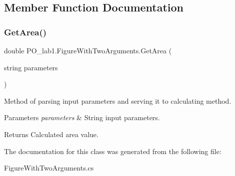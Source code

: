 \subsection{Member Function Documentation}
\mbox{\label{class_p_o__lab1_1_1_figure_with_two_arguments_a443df5d9e9eb30bb0ab7d1af55557af4}} 
\subsubsection{\texorpdfstring{Get\+Area()}{GetArea()}}
{\footnotesize\ttfamily double P\+O\+\_\+lab1.\+Figure\+With\+Two\+Arguments.\+Get\+Area (\begin{DoxyParamCaption}\item[{string}]{parameters }\end{DoxyParamCaption})\hspace{0.3cm}{\ttfamily [inline]}}



Method of parsing input parameters and serving it to calculating method. 


\begin{DoxyParams}{Parameters}
{\em parameters} & String input parameters.\\
\hline
\end{DoxyParams}
\begin{DoxyReturn}{Returns}
Calculated area value.
\end{DoxyReturn}


The documentation for this class was generated from the following file\+:\begin{DoxyCompactItemize}
\item 
Figure\+With\+Two\+Arguments.\+cs\end{DoxyCompactItemize}
